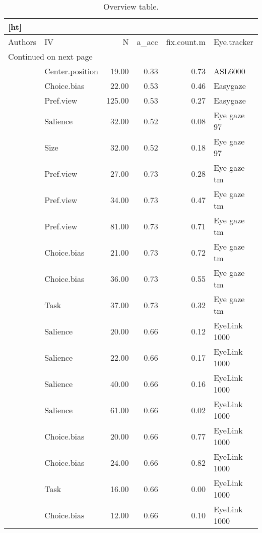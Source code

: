 \begin{longtable}{llrrrl}[ht]
\caption{Overview table.} \\ 
  \hline
Authors & IV & N & a_acc & fix.count.m & Eye.tracker \\ 
  \hline
\endhead
\hline
\multicolumn{7}{l}{\footnotesize Continued on next page}
\endfoot
\endlastfoot
 \hline
\cite{kreplin2014a} & LR.position & 19.00 & 0.33 & 0.27 & ASL6000 \\ 
  \cite{kreplin2014a} & Center.position & 19.00 & 0.33 & 0.73 & ASL6000 \\ 
  \cite{vanderlaan2015} & Choice.bias & 22.00 & 0.53 & 0.46 & Easygaze \\ 
  \cite{vanderlaan2017} & Pref.view & 125.00 & 0.53 & 0.27 & Easygaze \\ 
  \cite{lohse1997a} & Salience & 32.00 & 0.52 & 0.08 & Eye gaze 97 \\ 
  \cite{lohse1997a} & Size & 32.00 & 0.52 & 0.18 & Eye gaze 97 \\ 
  \cite{ashby2015} & Pref.view & 27.00 & 0.73 & 0.28 & Eye gaze tm \\ 
  \cite{ashby2015} & Pref.view & 34.00 & 0.73 & 0.47 & Eye gaze tm \\ 
  \cite{ashby2015} & Pref.view & 81.00 & 0.73 & 0.71 & Eye gaze tm \\ 
  \cite{fiedler2012} & Choice.bias & 21.00 & 0.73 & 0.72 & Eye gaze tm \\ 
  \cite{fiedler2012} & Choice.bias & 36.00 & 0.73 & 0.55 & Eye gaze tm \\ 
  \cite{rubaltelli2012} & Task & 37.00 & 0.73 & 0.32 & Eye gaze tm \\ 
  \cite{bagger2016} & Salience & 20.00 & 0.66 & 0.12 & EyeLink 1000 \\ 
  \cite{bagger2016} & Salience & 22.00 & 0.66 & 0.17 & EyeLink 1000 \\ 
  \cite{bagger2016} & Salience & 40.00 & 0.66 & 0.16 & EyeLink 1000 \\ 
  \cite{bagger2016} & Salience & 61.00 & 0.66 & 0.02 & EyeLink 1000 \\ 
  \cite{cavanagh2014} & Choice.bias & 20.00 & 0.66 & 0.77 & EyeLink 1000 \\ 
  \cite{folke2016} & Choice.bias & 24.00 & 0.66 & 0.82 & EyeLink 1000 \\ 
  \cite{glaholt2009a} & Task & 16.00 & 0.66 & 0.00 & EyeLink 1000 \\ 
  \cite{glaholt2009b} & Choice.bias & 12.00 & 0.66 & 0.10 & EyeLink 1000 \\ 

\end{longtable}
